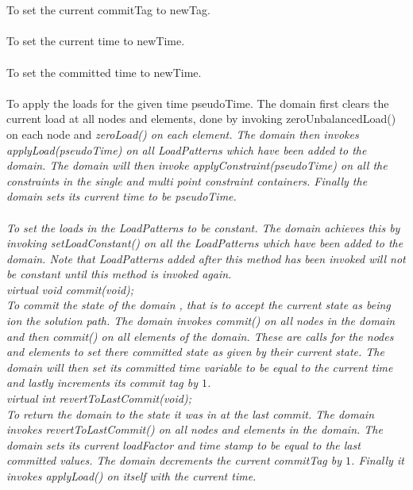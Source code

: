{%
  \\
 \\
To set the current commitTag to \p newTag. \\

 \\
To set the current time to \p newTime. \\

 \\
To set the committed time to \p newTime. \\

 \\ 
To apply the loads for the given time \p pseudoTime. The domain
first clears the current load at all nodes and elements, done by
invoking zeroUnbalancedLoad()} on each node and {\em zeroLoad()
on each element. The domain then invokes {\em applyLoad(pseudoTime)}
on all LoadPatterns which have been added to the domain. The domain
will then invoke {\em applyConstraint(pseudoTime)} on all the
constraints in the single and multi point constraint
containers. Finally the domain sets its current time to be {\em
pseudoTime}.\\  

 \\
To set the loads in the LoadPatterns to be constant. The domain
achieves this by invoking setLoadConstant() on all the
LoadPatterns which have been added to the domain. Note that
LoadPatterns added after this method has been invoked will not be
constant until this method is invoked again. \\


{\em virtual void commit(void);} \\
To commit the state of the domain , that is to accept the current
state as being ion the solution path. The domain invokes {\em
commit()} on all nodes in the domain and then {\em 
commit()} on all elements of the domain. These are calls for the nodes
and elements to set there committed state as given by their current
state. The domain will then set its committed time variable to be
equal to the current time and lastly increments its commit tag by $1$. \\ 


{\em virtual int revertToLastCommit(void);} \\
To return the domain to the state it was in at the last commit. The
domain invokes revertToLastCommit() on all nodes and elements in
the domain. The domain sets its current loadFactor and time
stamp to be equal to the last committed values. The domain decrements
the current commitTag by $1$. Finally it invokes applyLoad()
on itself with the current time.\\

}
